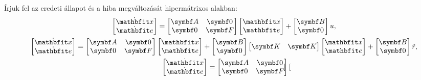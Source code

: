 Írjuk fel az eredeti állapot és a hiba megváltozását hipermátrixos alakban:
\begin{gather}
  \begin{bmatrix}
    \dot{\rvec x} \\ \dot{\rvec e}
  \end{bmatrix} = \begin{bmatrix}
    \rmat A & \rmat 0 \\ \rmat 0 & \rmat F
  \end{bmatrix} \begin{bmatrix}
    \rvec x \\ \rvec e
  \end{bmatrix} + \begin{bmatrix}
    \rmat B \\ \rmat 0
  \end{bmatrix} u
  ,
  \\
  \begin{bmatrix}
    \dot{\rvec x} \\ \dot{\rvec e}
  \end{bmatrix} = \begin{bmatrix}
    \rmat A & \rmat 0 \\ \rmat 0 & \rmat F
  \end{bmatrix} \begin{bmatrix}
    \rvec x \\ \rvec e
  \end{bmatrix} + \begin{bmatrix}
    \rmat B \\ \rmat 0
  \end{bmatrix} \begin{bmatrix}
    \rmat K & \rmat K
  \end{bmatrix} \begin{bmatrix}
    \rvec x \\ \rvec e
  \end{bmatrix} + \begin{bmatrix}
    \rmat B \\ \rmat 0
  \end{bmatrix} \tilde r
  ,
  \\
  \begin{bmatrix}
    \dot{\rvec x} \\ \dot{\rvec e}
  \end{bmatrix} = \begin{bmatrix}
    \rmat A & \rmat 0 \\ \rmat 0 & \rmat F
  \end{bmatrix} \begin{bmatrix}

\end{bmatrix}
\end{gather}
